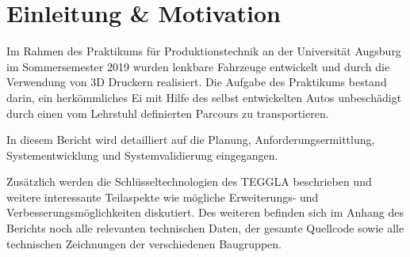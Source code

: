 \chapter{Einleitung \& Motivation}
Im Rahmen des Praktikums für Produktionstechnik an der Universität Augsburg im Sommersemester 2019 wurden lenkbare Fahrzeuge entwickelt und durch die Verwendung von 3D Druckern realisiert. Die Aufgabe des Praktikums bestand darin, ein herkömmliches Ei mit Hilfe des selbst entwickelten Autos unbeschädigt durch einen vom Lehrstuhl definierten Parcours zu transportieren.

In diesem Bericht wird detailliert auf die Planung, Anforderungsermittlung, Systementwicklung und Systemvalidierung eingegangen. 

Zusätzlich werden die Schlüsseltechnologien des TEGGLA beschrieben und weitere interessante Teilaspekte wie mögliche Erweiterungs- und Verbesserungsmöglichkeiten diskutiert. Des weiteren befinden sich im Anhang des Berichts noch alle relevanten technischen Daten, der gesamte Quellcode sowie alle technischen Zeichnungen der verschiedenen Baugruppen.

